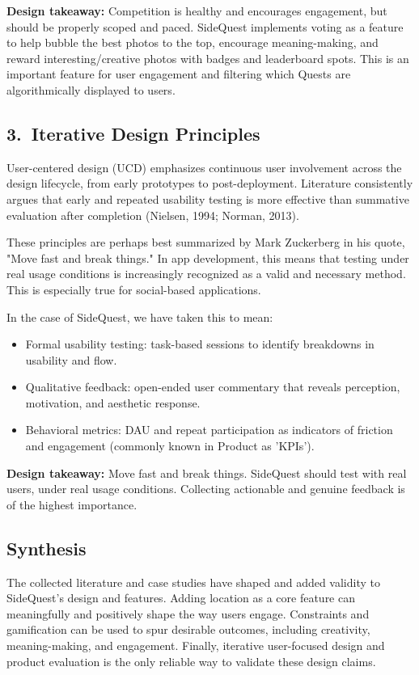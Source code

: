 \documentclass[12pt]{article}
\begin{document}
\textbf{Design takeaway:} Competition is healthy and encourages engagement, but should be properly scoped and paced. SideQuest implements voting as a feature to help bubble the best photos to the top, encourage meaning-making, and reward interesting/creative photos with badges and leaderboard spots. This is an important feature for user engagement and filtering which Quests are algorithmically displayed to users.

\subsection*{3.\ Iterative Design Principles}
User-centered design (UCD) emphasizes continuous user involvement across the design lifecycle, from early prototypes to post-deployment. Literature consistently argues that early and repeated usability testing is more effective than summative evaluation after completion (Nielsen, 1994; Norman, 2013).

These principles are perhaps best summarized by Mark Zuckerberg in his quote, "Move fast and break things." In app development, this means that testing under real usage conditions is increasingly recognized as a valid and necessary method. This is especially true for social-based applications.

In the case of SideQuest, we have taken this to mean:
\begin{itemize}[leftmargin=*, itemsep=0.25\baselineskip]
  \item Formal usability testing: task-based sessions to identify breakdowns in usability and flow.
  \item Qualitative feedback: open-ended user commentary that reveals perception, motivation, and aesthetic response.
  \item Behavioral metrics: DAU and repeat participation as indicators of friction and engagement (commonly known in Product as 'KPIs').
\end{itemize}

\textbf{Design takeaway:} Move fast and break things. SideQuest should test with real users, under real usage conditions. Collecting actionable and genuine feedback is of the highest importance.

\subsection*{Synthesis}
The collected literature and case studies have shaped and added validity to SideQuest's design and features. Adding location as a core feature can meaningfully and positively shape the way users engage. Constraints and gamification can be used to spur desirable outcomes, including creativity, meaning-making, and engagement. Finally, iterative user-focused design and product evaluation is the only reliable way to validate these design claims.
\end{document}
